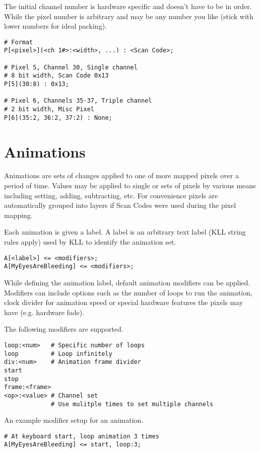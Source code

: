 \documentclass{kiibohd-template}
\begin{document}
The initial channel number is hardware specific and doesn't have to be in order.
While the pixel number is arbitrary and may be any number you like (stick with lower numbers for ideal packing).

\begin{lstlisting}
# Format
P[<pixel>](<ch 1#>:<width>, ...) : <Scan Code>;

# Pixel 5, Channel 30, Single channel
# 8 bit width, Scan Code 0x13
P[5](30:8) : 0x13;

# Pixel 6, Channels 35-37, Triple channel
# 2 bit width, Misc Pixel
P[6](35:2, 36:2, 37:2) : None;
\end{lstlisting}


\section{Animations}
\label{sec:animations}

Animations are sets of changes applied to one of more mapped pixels over a period of time.
Values may be applied to single or sets of pixels by various means including setting, adding, subtracting, etc.
For convenience pixels are automatically grouped into layers if Scan Codes were used during the pixel mapping.

Each animation is given a label.
A label is an arbitrary text label (KLL string rules apply) used by KLL to identify the animation set.

\begin{lstlisting}
A[<label>] <= <modifiers>;
A[MyEyesAreBleeding] <= <modifiers>;
\end{lstlisting}

While defining the animation label, default animation modifiers can be applied.
Modifiers can include options such as the number of loops to run the animation, clock divider for animation speed or special hardware features the pixels may have (e.g. hardware fade).

The following modifiers are supported.

\begin{lstlisting}
loop:<num>   # Specific number of loops
loop         # Loop infinitely
div:<num>    # Animation frame divider
start
stop
frame:<frame>
<op>:<value> # Channel set
             # Use mulitple times to set multiple channels
\end{lstlisting}

An example modifier setup for an animation.

\begin{lstlisting}
# At keyboard start, loop animation 3 times
A[MyEyesAreBleeding] <= start, loop:3;
\end{lstlisting}
\end{document}
